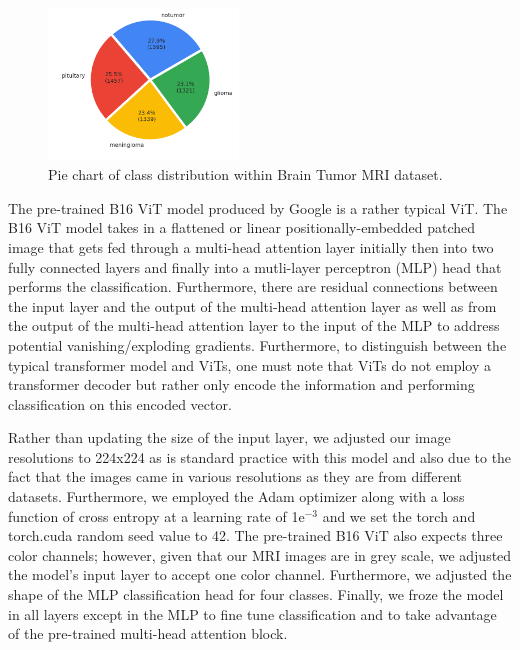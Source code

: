 \documentclass[conference]{IEEEtran}
\begin{document}
\begin{figure}[h]
    \centering
    \includegraphics[width=0.45\textwidth]{class distribution.PNG}
    \caption{Pie chart of class distribution within Brain Tumor MRI dataset.}
    \label{fig:piechart}
\end{figure}

The pre-trained B16 ViT model produced by Google is a rather typical ViT. The B16 ViT model takes in a flattened or linear positionally-embedded patched image that gets fed through a multi-head attention layer initially then into two fully connected layers and finally into a mutli-layer perceptron (MLP) head that performs the classification. Furthermore, there are residual connections between the input layer and the output of the multi-head attention layer as well as from the output of the multi-head attention layer to the input of the MLP to address potential vanishing/exploding gradients. Furthermore, to distinguish between the typical transformer model and ViTs, one must note that ViTs do not employ a transformer decoder but rather only encode the information and performing classification on this encoded vector.

Rather than updating the size of the input layer, we adjusted our image resolutions to 224x224 as is standard practice with this model and also due to the fact that the images came in various resolutions as they are from different datasets. Furthermore, we employed the Adam optimizer along with a loss function of cross entropy at a learning rate of 1e$^{-3}$ and we set the torch and torch.cuda random seed value to 42. The pre-trained B16 ViT also expects three color channels; however, given that our MRI images are in grey scale, we adjusted the model's input layer to accept one color channel. Furthermore, we adjusted the shape of the MLP classification head for four classes. Finally, we froze the model in all layers except in the MLP to fine tune classification and to take advantage of the pre-trained multi-head attention block.
\end{document}
